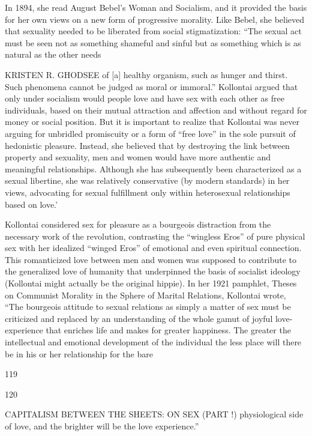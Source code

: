 In 1894, she read August Bebel’s Woman and Socialism, and it provided the basis for her own views on a new form of progressive morality. Like Bebel, she believed that sexuality needed to be liberated from social stigmatization: “The sexual act must be seen not as something shameful and sinful but as something which is as natural as the other needs
 \par 
KRISTEN R. GHODSEE of [a] healthy organism, such as hunger and thirst. Such phenomena cannot be judged as moral or immoral.” Kollontai argued that only under socialism would people love and have sex with each other as free individuals, based on their mutual attraction and affection and without regard for money or social position. But it is important to realize that Kollontai was never arguing for unbridled promiscuity or a form of “free love” in the sole pursuit of hedonistic pleasure. Instead, she believed that by destroying the link between property and sexuality, men and women would have more authentic and meaningful relationships. Although she has subsequently been characterized as a sexual libertine, she was relatively conservative (by modern standards) in her views, advocating for sexual fulfillment only within heterosexual relationships based on love.’
 \par 
Kollontai considered sex for pleasure as a bourgeois distraction from the necessary work of the revolution, contrasting the “wingless Eros” of pure physical sex with her idealized “winged Eros” of emotional and even spiritual connection. This romanticized love between men and women was supposed to contribute to the generalized love of humanity that underpinned the basis of socialist ideology (Kollontai might actually be the original hippie). In her 1921 pamphlet, Theses on Communist Morality in the Sphere of Marital Relations, Kollontai wrote, “The bourgeois attitude to sexual relations as simply a matter of sex must be criticized and replaced by an understanding of the whole gamut of joyful love-experience that enriches life and makes for greater happiness. The greater the intellectual and emotional development of the individual the less place will there be in his or her relationship for the bare
 \par 
119
 \par 
120
 \par 
CAPITALISM BETWEEN THE SHEETS: ON SEX (PART !) physiological side of love, and the brighter will be the love experience.”
 \par 
